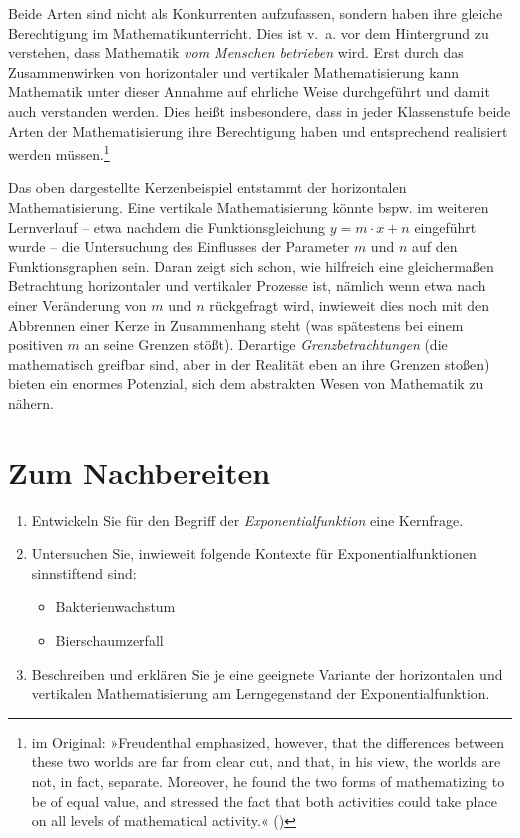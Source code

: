 \documentclass[
]{scrbook}
\providecommand{\tightlist}{%
  \setlength{\itemsep}{0pt}\setlength{\parskip}{0pt}}
\theoremstyle{definition}
\theoremstyle{definition}
\theoremstyle{definition}
\theoremstyle{definition}
\theoremstyle{remark}
\begin{document}
Beide Arten sind nicht als Konkurrenten aufzufassen, sondern haben ihre gleiche Berechtigung im Mathematikunterricht. Dies ist v.~a. vor dem Hintergrund zu verstehen, dass Mathematik \emph{vom Menschen betrieben} wird. Erst durch das Zusammenwirken von horizontaler und vertikaler Mathematisierung kann Mathematik unter dieser Annahme auf ehrliche Weise durchgeführt und damit auch verstanden werden. Dies heißt insbesondere, dass in jeder Klassenstufe beide Arten der Mathematisierung ihre Berechtigung haben und entsprechend realisiert werden müssen.\footnote{im Original: »Freudenthal emphasized, however, that the differences between these two worlds are far from clear cut, and that, in his view, the worlds are not, in fact, separate. Moreover, he found the two forms of mathematizing to be of equal value, and stressed the fact that both activities could take place on all levels of mathematical activity.« ()}

Das oben dargestellte Kerzenbeispiel entstammt der horizontalen Mathematisierung. Eine vertikale Mathematisierung könnte bspw. im weiteren Lernverlauf -- etwa nachdem die Funktionsgleichung \(y = m\cdot x + n\) eingeführt wurde -- die Untersuchung des Einflusses der Parameter \(m\) und \(n\) auf den Funktionsgraphen sein. Daran zeigt sich schon, wie hilfreich eine gleichermaßen Betrachtung horizontaler und vertikaler Prozesse ist, nämlich wenn etwa nach einer Veränderung von \(m\) und \(n\) rückgefragt wird, inwieweit dies noch mit den Abbrennen einer Kerze in Zusammenhang steht (was spätestens bei einem positiven \(m\) an seine Grenzen stößt). Derartige \emph{Grenzbetrachtungen} (die mathematisch greifbar sind, aber in der Realität eben an ihre Grenzen stoßen) bieten ein enormes Potenzial, sich dem abstrakten Wesen von Mathematik zu nähern.

\section{Zum Nachbereiten}\label{kernideen-kontexte-nachbereitung}

\begin{enumerate}
\def\labelenumi{\arabic{enumi}.}
\tightlist
\item
  Entwickeln Sie für den Begriff der \emph{Exponentialfunktion} eine Kernfrage.
\item
  Untersuchen Sie, inwieweit folgende Kontexte für Exponentialfunktionen sinnstiftend sind:

  \begin{itemize}
  \tightlist
  \item
    Bakterienwachstum
  \item
    Bierschaumzerfall
  \end{itemize}
\item
  Beschreiben und erklären Sie je eine geeignete Variante der horizontalen und vertikalen Mathematisierung am Lerngegenstand der Exponentialfunktion.
\end{enumerate}
\end{document}
